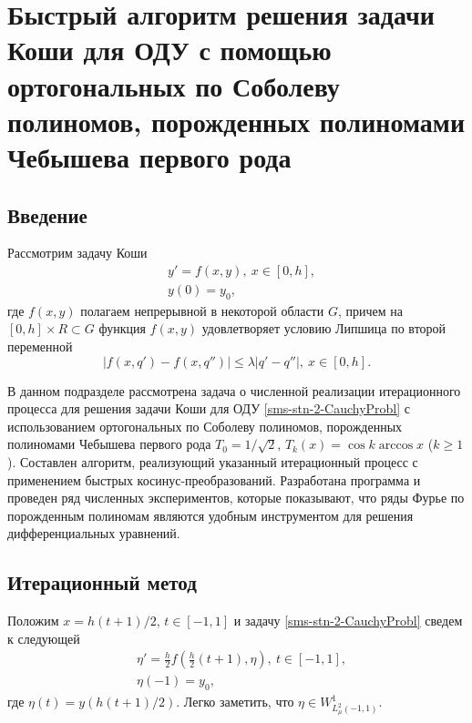 ﻿\section{Быстрый алгоритм решения задачи Коши для ОДУ с помощью ортогональных по Соболеву полиномов, порожденных полиномами Чебышева первого рода}



\subsection{Введение}

Рассмотрим задачу Коши
\begin{equation}\label{sms-stn-2-CauchyProbl}
\begin{aligned}
&y'=f(x,y),\ x\in[0,h],\\
&y(0)=y_0,
\end{aligned}
\end{equation}
где $f(x,y)$ полагаем непрерывной в некоторой области $G$, причем на $[0,h]\times R\subset G$ функция $f(x,y)$ удовлетворяет условию Липшица по второй переменной
\begin{equation}\label{sms-stn-2-LipSecVar}
|f(x,q')-f(x,q'')|\le\lambda|q'-q''|,\ x\in[0,h].
\end{equation}

В данном подразделе рассмотрена задача о численной реализации итерационного процесса для решения задачи Коши для ОДУ \eqref{sms-stn-2-CauchyProbl} с использованием ортогональных по Соболеву полиномов, порожденных полиномами Чебышева первого рода $T_0=1/\sqrt{2}$, $T_k(x)=\cos k\arccos x$ ($k\ge1$). Составлен алгоритм, реализующий указанный итерационный процесс с применением быстрых косинус-преобразова\-ний. Разработана программа и проведен ряд численных экспериментов, которые показывают, что ряды Фурье по порожденным полиномам являются удобным инструментом для решения дифференциальных уравнений.

\subsection{Итерационный метод}

Положим $x=h(t+1)/2$, $t\in[-1,1]$ и задачу \eqref{sms-stn-2-CauchyProbl} сведем к следующей
\begin{equation}\label{sms-stn-2-CauchyProblEta}
\begin{aligned}
&\eta'=\frac h2f\left(\frac h2(t+1),\eta\right),\ t\in[-1,1],\\
&\eta(-1)=y_0,
\end{aligned}
\end{equation}
где $\eta(t)= y(h(t+1)/2)$. Легко заметить, что $\eta\in W^1_{L^2_\mu(-1,1)}$.

